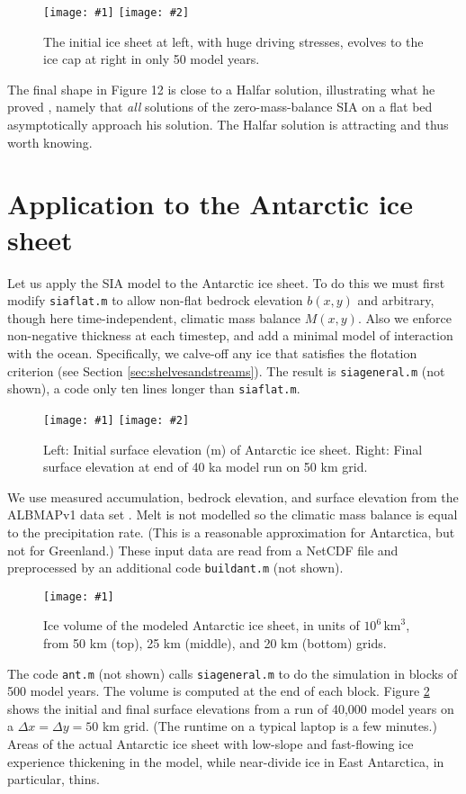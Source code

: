 \documentclass[letterpaper,final,12pt,reqno]{amsart}
\newcommand{\onefigsize}[3]{
\begin{figure}[ht]
\centering
\texttt{[image: \#1]}
\caption{#2}
\label{fig:#1}
\end{figure}}
\newcommand{\onefig}[2]{\onefigsize{#1}{#2}{3.0in}}
\newcommand{\twofigsizes}[5]{
\begin{figure}[ht]
\centering
\texttt{[image: \#1]} \quad
\texttt{[image: \#2]}
\caption{#3}
\label{fig:#1}
\end{figure}}
\begin{document}
\twofigsizes{roughinitial}{roughfinal}{The initial ice sheet at left, with huge driving stresses, evolves to the ice cap at right in only 50 model years.}{2.9in}{2.9in}

The final shape in Figure 12 is close to a Halfar solution, illustrating what he proved \cite{Halfar81,Halfar83}, namely that \emph{all} solutions of the zero-mass-balance SIA on a flat bed asymptotically approach his solution.  The Halfar solution is attracting and thus worth knowing.

\section{Application to the Antarctic ice sheet}   \label{sec:antapp}

Let us apply the SIA model to the Antarctic ice sheet.  To do this we must first modify \texttt{siaflat.m} to allow non-flat bedrock elevation $b(x,y)$ and arbitrary, though here time-independent, climatic mass balance $M(x,y)$.  Also we enforce non-negative thickness at each timestep, and add a minimal model of interaction with the ocean.  Specifically, we calve-off any ice that satisfies the flotation criterion (see Section \ref{sec:shelvesandstreams}).  The result is \texttt{siageneral.m} (not shown), a code only ten lines longer than \texttt{siaflat.m}.

\twofigsizes{antinitial}{antfinal}{Left: Initial surface elevation (m) of Antarctic ice sheet.  Right: Final surface elevation at end of 40 ka model run on 50 km grid.}{2.55in}{3.2in}

We use measured accumulation, bedrock elevation, and surface elevation from the ALBMAPv1 data set \cite{LeBrocqetal2010}.  Melt is not modelled so the climatic mass balance is equal to the precipitation rate.  (This is a reasonable approximation for Antarctica, but not for Greenland.)  These input data are read from a NetCDF file and preprocessed by an additional code \texttt{buildant.m} (not shown).

\onefig{antvolcompare}{Ice volume of the modeled Antarctic ice sheet, in units of $10^6 \, \text{km}^3$, from 50 km (top), 25 km (middle), and 20 km (bottom) grids.}

The code \texttt{ant.m} (not shown) calls \texttt{siageneral.m} to do the simulation in blocks of 500 model years.  The volume is computed at the end of each block.  Figure \ref{fig:antinitial} shows the initial and final surface elevations from a run of 40,000 model years on a $\Delta x = \Delta y = 50$ km grid.  (The runtime on a typical laptop is a few minutes.)  Areas of the actual Antarctic ice sheet with low-slope and fast-flowing ice experience thickening in the model, while near-divide ice in East Antarctica, in particular, thins.
\end{document}

